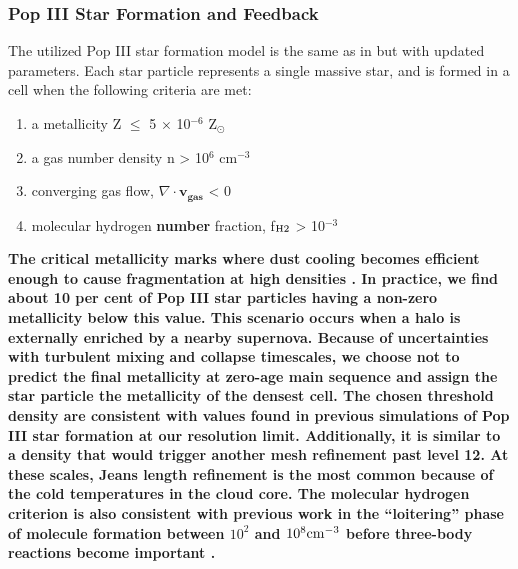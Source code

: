 \documentclass[fleqn,usenatbib]{mnras}
\begin{document}
\subsubsection{Pop III Star Formation and Feedback }
The utilized Pop III star formation model is the same as in \citet{Wise08_Gal} but with updated parameters. Each star particle represents a single massive star, and is formed in a cell when the following criteria are met: 
\begin{enumerate}
	\item a metallicity Z $\leq$ 5 $\times$ 10$^{-6}$ Z$_{\odot}$

	\item a gas number density n > 10$^{6}$ cm$^{-3}$

	\item converging gas flow, $\nabla \cdot \mathbf{v_{gas}}$ < 0 

	\item molecular hydrogen \textbf{number} fraction, f$_{\rm H2}$ > 10$^{-3}$
\end{enumerate}
\textbf{The critical metallicity marks where dust cooling becomes efficient enough to cause fragmentation at high densities \citep[e.g.][]{Schneider06_Frag}.  In practice, we find about 10 per cent of Pop III star particles having a non-zero metallicity below this value.  This scenario occurs when a halo is externally enriched by a nearby supernova.  Because of uncertainties with turbulent mixing and collapse timescales, we choose not to predict the final metallicity at zero-age main sequence and assign the star particle the metallicity of the densest cell.  The chosen threshold density are consistent with values found in previous simulations of Pop III star formation \citep[e.g.][]{Hirano15} at our resolution limit.  Additionally, it is similar to a density that would trigger another mesh refinement past level 12.  At these scales, Jeans length refinement is the most common because of the cold temperatures in the cloud core.  The molecular hydrogen criterion is also consistent with previous work in the ``loitering'' phase of molecule formation between $10^2$ and $10^8 \cubecm$ before three-body reactions become important \citep[e.g.][]{Omukai10}.}
\end{document}

